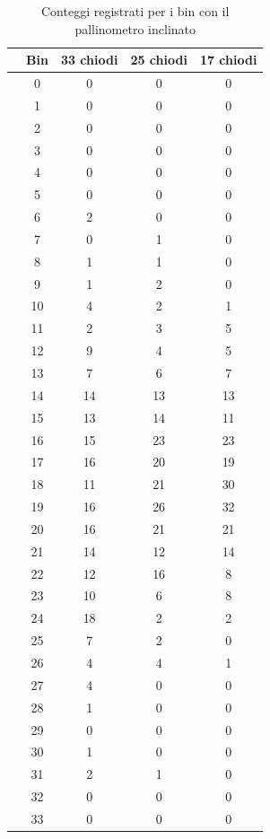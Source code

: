 \documentclass[10pt,oneside,a4paper]{article}
\begin{document}
\begin{table}[H]
\caption{Conteggi registrati per i bin con il pallinometro inclinato}
\label{tab:palli_inclinato}
\centering
\begin{tabular}{ccccc}
  \hline
 & Bin & 33 chiodi & 25 chiodi & 17 chiodi \\   
 \hline
&0 & 0 & 0 & 0 \\  
&1 & 0 & 0 & 0 \\ 
&2 & 0 & 0 & 0 \\ 
&3 & 0 & 0 & 0 \\ 
&4 & 0 & 0 & 0 \\ 
&5 & 0 & 0 & 0 \\ 
&6 & 2 & 0 & 0 \\ 
&7 & 0 & 1 & 0 \\ 
&8 & 1 & 1 & 0 \\ 
&9 & 1 & 2 & 0 \\ 
&10 & 4 & 2 & 1 \\ 
  &11 & 2 & 3 & 5 \\ 
  &12 & 9 & 4 & 5 \\ 
  &13 & 7 & 6 & 7 \\ 
  &14 & 14 & 13 & 13 \\ 
  &15 & 13 & 14 & 11 \\ 
  &16 & 15 & 23 & 23 \\ 
  &17 & 16 & 20 & 19 \\ 
  &18 & 11 & 21 & 30 \\ 
  &19 & 16 & 26 & 32 \\ 
  &20 & 16 & 21 & 21 \\ 
  &21 & 14 & 12 & 14 \\ 
  &22 & 12 & 16 & 8 \\ 
  &23 & 10 & 6 & 8 \\ 
  &24 & 18 & 2 & 2 \\ 
  &25 & 7 & 2 & 0 \\ 
  &26 & 4 & 4 & 1 \\ 
  &27 & 4 & 0 & 0 \\ 
  &28 & 1 & 0 & 0 \\ 
  &29 & 0 & 0 & 0 \\ 
  &30 & 1 & 0 & 0 \\ 
  &31 & 2 & 1 & 0 \\ 
  &32 & 0 & 0 & 0 \\ 
  &33 & 0 & 0 & 0 \\ 
   \hline
\end{tabular}
\end{table}
\end{document}
